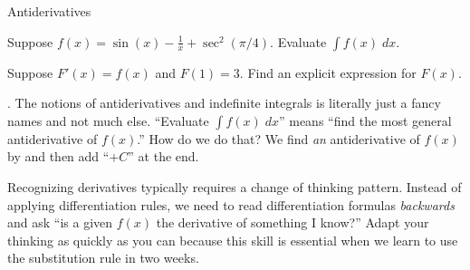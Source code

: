 \documentclass[../main.tex]{subfiles}
\begin{document}
\begin{lesson}{Antiderivatives}
\begin{mdframed}[style=withref-compact]
  \end{mdframed}

  \begin{example}
    Suppose \(f(x) = \sin(x) - \frac{1}{x} + \sec^{2}(\pi/4)\). Evaluate \(\int f(x) \;dx\). 

    Suppose \(F'(x) = f(x)\) and \(F(1) = 3\). Find an explicit expression for \(F(x)\).

  \end{example}

  . The notions of antiderivatives and indefinite integrals is literally just a fancy names and not much else. ``Evaluate \(\textstyle \int f(x) \;dx\)'' means ``find the most general antiderivative of \(f(x)\).'' How do we do that? We find \emph{an} antiderivative of \(f(x)\) by  and then add ``\(+ C\)'' at the end.

  Recognizing derivatives typically requires a change of thinking pattern. Instead of applying differentiation rules, we need to read differentiation formulas \emph{backwards} and ask ``is a given \(f(x)\) the derivative of something I know?'' Adapt your thinking as quickly as you can because this skill is essential when we learn to use the substitution rule in two weeks.

  \clearpage
\end{lesson}
\end{document}
